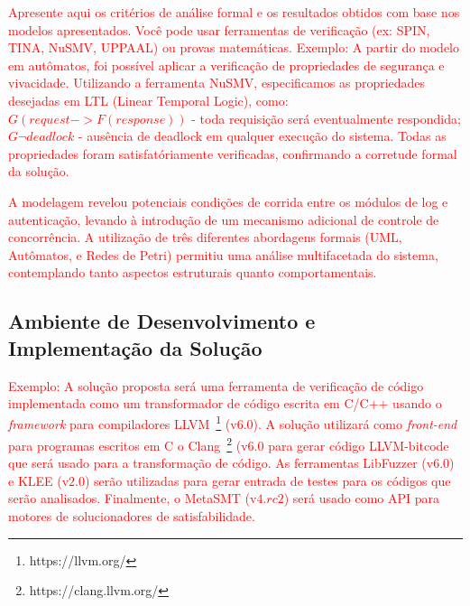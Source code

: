 \textcolor{red}{Apresente aqui os critérios de análise formal e os resultados obtidos com base nos modelos apresentados. Você pode usar ferramentas de verificação (ex: SPIN, TINA, NuSMV, UPPAAL) ou provas matemáticas.
%
Exemplo: A partir do modelo em autômatos, foi possível aplicar a verificação de propriedades de segurança e vivacidade.
Utilizando a ferramenta NuSMV, especificamos as propriedades desejadas em LTL (Linear Temporal Logic), como: $G(request -> F(response))$ - toda requisição será eventualmente respondida; $G \neg deadlock$ - ausência de deadlock em qualquer execução do sistema.
Todas as propriedades foram satisfatóriamente verificadas, confirmando a corretude formal da solução.}

\textcolor{red}{A modelagem revelou potenciais condições de corrida entre os módulos de log e autenticação, levando à introdução de um mecanismo adicional de controle de concorrência.
A utilização de três diferentes abordagens formais (UML, Autômatos, e Redes de Petri) permitiu uma análise multifacetada do sistema, contemplando tanto aspectos estruturais quanto comportamentais.}


\subsection{Ambiente de Desenvolvimento e Implementação da Solução}


\textcolor{red}{Exemplo: A solução proposta será uma ferramenta de verificação de código implementada como um transformador de código escrita em C/C++ usando o \textit{framework} para compiladores LLVM~\footnote{https://llvm.org/} (v$6.0$). A solução utilizará como \textit{front-end} para programas escritos em C o Clang~\footnote{https://clang.llvm.org/} (v$6.0$ para gerar código LLVM-bitcode que será usado para a transformação de código. As ferramentas LibFuzzer (v$6.0$) e KLEE (v$2.0$) serão utilizadas para gerar entrada de testes para os códigos que serão analisados. Finalmente, o MetaSMT (v$4.rc2$) será usado como API para motores de solucionadores de satisfabilidade.}



